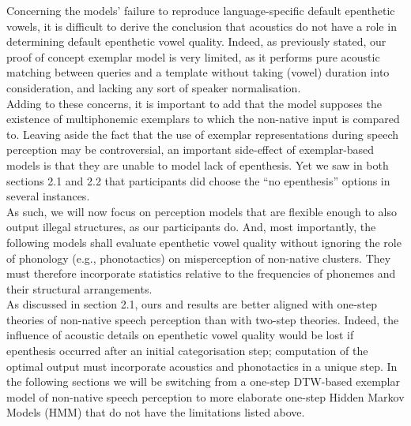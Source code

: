 {Concerning the models' failure to reproduce language-specific default epenthetic vowels, it is difficult to derive the conclusion that acoustics do not have a role in determining default epenthetic vowel quality. Indeed, as previously stated, our proof of concept exemplar model is very limited, as it performs pure acoustic matching between queries and a template without taking (vowel) duration into consideration, and lacking any sort of speaker normalisation. \\

Adding to these concerns, it is important to add that the model supposes the existence of {\color{red}multiphonemic} exemplars to which the non-native input is compared to. Leaving aside the fact that the use of exemplar representations during speech perception may be controversial, an important side-effect of exemplar-based models is that they are unable to model lack of epenthesis. Yet we saw in both {\color{red}sections 2.1 and 2.2} that participants did choose the ``no epenthesis'' options {\color{red}in several instances}.  \\

As such, we will now focus on perception models that are flexible enough to also output illegal structures, as our participants do. And, most importantly, the following models shall evaluate epenthetic vowel quality without ignoring the role of phonology (e.g., phonotactics) on misperception of non-native clusters. They must therefore incorporate statistics relative to the frequencies of phonemes and their structural {\color{red}arrangements}. \\

As discussed in {\color{red} section 2.1}, ours and \cite{dupoux2011} results are better aligned with one-step theories of non-native speech perception than with two-step theories. Indeed, the influence of acoustic details on epenthetic vowel quality would be lost if epenthesis occurred after an initial categorisation step; computation of the optimal output must incorporate acoustics and phonotactics in a unique step. In the following sections we will be switching from a one-step DTW-based exemplar model of non-native speech perception to more elaborate one-step Hidden Markov Models (HMM) that do not have the limitations listed above.}

